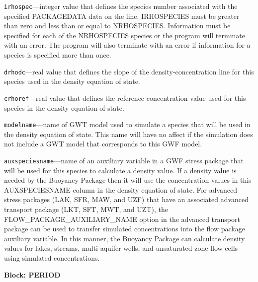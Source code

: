 \begin{description}
\item \texttt{irhospec}---integer value that defines the species number associated with the specified PACKAGEDATA data on the line. IRHOSPECIES must be greater than zero and less than or equal to NRHOSPECIES. Information must be specified for each of the NRHOSPECIES species or the program will terminate with an error.  The program will also terminate with an error if information for a species is specified more than once.

\item \texttt{drhodc}---real value that defines the slope of the density-concentration line for this species used in the density equation of state.

\item \texttt{crhoref}---real value that defines the reference concentration value used for this species in the density equation of state.

\item \texttt{modelname}---name of GWT model used to simulate a species that will be used in the density equation of state.  This name will have no affect if the simulation does not include a GWT model that corresponds to this GWF model.

\item \texttt{auxspeciesname}---name of an auxiliary variable in a GWF stress package that will be used for this species to calculate a density value.  If a density value is needed by the Buoyancy Package then it will use the concentration values in this AUXSPECIESNAME column in the density equation of state.  For advanced stress packages (LAK, SFR, MAW, and UZF) that have an associated advanced transport package (LKT, SFT, MWT, and UZT), the FLOW\_PACKAGE\_AUXILIARY\_NAME option in the advanced transport package can be used to transfer simulated concentrations into the flow package auxiliary variable.  In this manner, the Buoyancy Package can calculate density values for lakes, streams, multi-aquifer wells, and unsaturated zone flow cells using simulated concentrations.

\end{description}
\item \textbf{Block: PERIOD}

